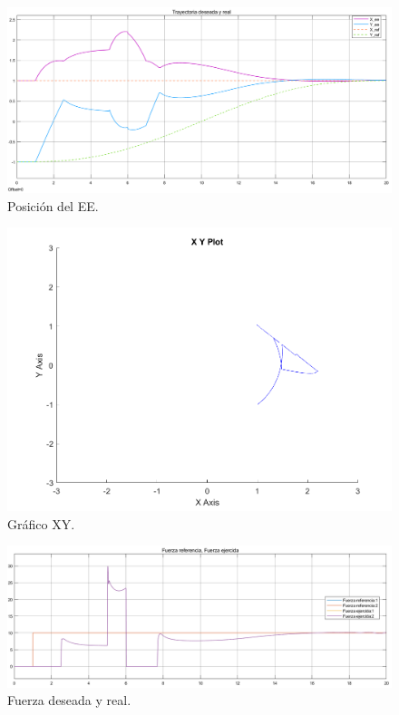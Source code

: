 \begin{figure}[H]
	\centering
	\includegraphics[width=0.8\linewidth]{ImagenesControl híbrido no lineal/3_3_f_b}
	\caption{Posici\'on del EE.}	
	\label{fig:cposd}
\end{figure}
\begin{figure}[H]
	\centering
	\includegraphics[width=0.5\linewidth]{ImagenesControl híbrido no lineal/3_3_f_c}
	\caption{Gr\'afico XY.}	
	\label{fig:cxyd}
\end{figure}
\begin{figure}[H]
	\centering
	\includegraphics[width=0.8\linewidth]{ImagenesControl híbrido no lineal/3_3_f_e}
	\caption{Fuerza deseada y real.}	
	\label{fig:cfd}
\end{figure}
%